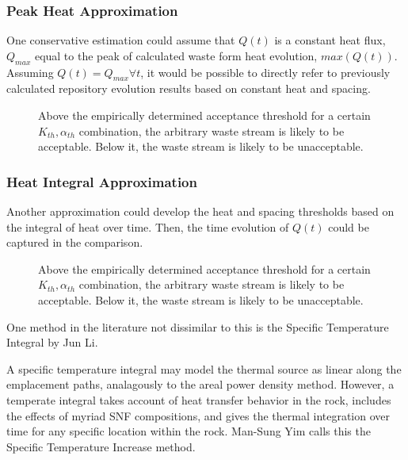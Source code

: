 \subsubsection{Peak Heat Approximation}

One conservative estimation could assume that $Q(t)$ is a constant heat flux, 
$Q_{max}$ equal to the peak of calculated waste form heat evolution, 
$max(Q(t))$. Assuming $Q(t) = Q_{max} \forall t$, it would be possible to 
directly refer to previously calculated repository evolution results 
based on constant heat and spacing. 

\begin{figure}[htb!]
  \begin{center}
    \def\svgwidth{.7\textwidth}
    
  \end{center}
  \caption{Above the empirically determined acceptance threshold for a certain 
  $K_{th}, \alpha_{th}$ combination, the arbitrary  waste stream is likely to be 
  acceptable. Below it, the waste stream is likely to be unacceptable. }
  \label{fig:acceptance}
\end{figure}

\subsubsection{Heat Integral Approximation}

Another approximation could develop the heat and spacing thresholds based on the 
integral of heat over time. Then, the time evolution of $Q(t)$ could be captured  
in the comparison. 

\begin{figure}[htb!]
  \begin{center}
    \def\svgwidth{.7\textwidth}
    
  \end{center}
  \caption{Above the empirically determined acceptance threshold for a certain 
  $K_{th}, \alpha_{th}$ combination, the arbitrary  waste stream is likely to be 
  acceptable. Below it, the waste stream is likely to be unacceptable. }
  \label{fig:acceptanceInt}
\end{figure}

One method in the literature not dissimilar to this is the Specific Temperature 
Integral by Jun Li\cite{li_specific_2008}. 

A specific temperature integral may model the thermal source as linear along the
emplacement paths, analagously to the areal power density method.
However, a temperate integral takes account of heat transfer behavior in the
rock, includes the effects of myriad SNF compositions, and gives the thermal
integration over time for any specific location within the rock.  Man-Sung Yim
calls this the Specific Temperature Increase method\cite{li_specific_2008}.

